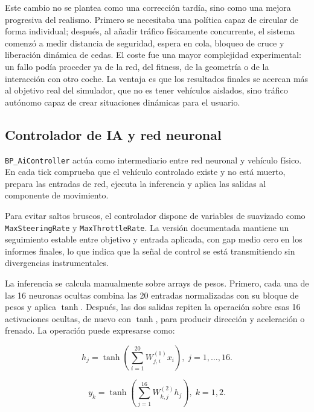 Este cambio no se plantea como una corrección tardía, sino como una mejora progresiva del realismo. Primero se necesitaba una política capaz de circular de forma individual; después, al añadir tráfico físicamente concurrente, el sistema comenzó a medir distancia de seguridad, espera en cola, bloqueo de cruce y liberación dinámica de cedas. El coste fue una mayor complejidad experimental: un fallo podía proceder ya de la red, del fitness, de la geometría o de la interacción con otro coche. La ventaja es que los resultados finales se acercan más al objetivo real del simulador, que no es tener vehículos aislados, sino tráfico autónomo capaz de crear situaciones dinámicas para el usuario.

\subsection{Controlador de IA y red neuronal}

\texttt{BP\_AiController} actúa como intermediario entre red neuronal y vehículo físico. En cada tick comprueba que el vehículo controlado existe y no está muerto, prepara las entradas de red, ejecuta la inferencia y aplica las salidas al componente de movimiento.

Para evitar saltos bruscos, el controlador dispone de variables de suavizado como \texttt{MaxSteeringRate} y \texttt{MaxThrottleRate}. La versión documentada mantiene un seguimiento estable entre objetivo y entrada aplicada, con gap medio cero en los informes finales, lo que indica que la señal de control se está transmitiendo sin divergencias instrumentales.

La inferencia se calcula manualmente sobre arrays de pesos. Primero, cada una de las 16 neuronas ocultas combina las 20 entradas normalizadas con su bloque de pesos y aplica \(\tanh\). Después, las dos salidas repiten la operación sobre esas 16 activaciones ocultas, de nuevo con \(\tanh\), para producir dirección y aceleración o frenado. La operación puede expresarse como:

\begin{equation}
\label{eq:capa-oculta}
h_j = \tanh\left(\sum_{i=1}^{20} W^{(1)}_{j,i} x_i\right),\; j=1,\ldots,16.
\end{equation}

\begin{equation}
\label{eq:capa-salida}
y_k = \tanh\left(\sum_{j=1}^{16} W^{(2)}_{k,j} h_j\right),\; k=1,2.
\end{equation}

